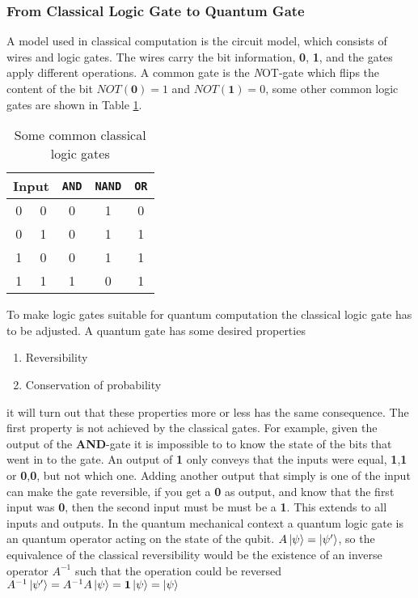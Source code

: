 \subsubsection{From Classical Logic Gate to Quantum Gate}
A model used in classical computation is the circuit model, which consists of wires and logic gates. The wires carry the bit information, \textbf{0}, \textbf{1}, and the gates apply different operations. A common gate is the {\textit NOT}-gate which flips the content of the bit $NOT(\textbf{0}) = 1$ and $NOT(\textbf{1}) = 0$, some other common logic gates are shown in Table \ref{tab:gates}. 

\begin{table}
    \centering
    \begin{tabular}{|c|c|c|c|c|}
    \hline
    \multicolumn{2}{|c|}{Input} & {\tt AND} & {\tt NAND} & {\tt OR}\\
    \hline
    0 & 0 & 0& 1& 0\\
    0 & 1 & 0& 1& 1\\
    1 & 0 & 0& 1& 1\\
    1 & 1 & 1& 0& 1\\
    \hline
    \end{tabular}
    \caption{Some common classical logic gates}
    \label{tab:gates}
\end{table}


To make logic gates suitable for quantum computation the classical logic gate has to be adjusted. A quantum gate has some desired properties
\begin{enumerate}
\item Reversibility 
\item Conservation of probability
\end{enumerate}
it will turn out that these properties more or less has the same consequence. The first property is not achieved by the classical gates. For example, given the output of the \textbf{AND}-gate it is impossible to to know the state of the bits that went in to the gate. An output of \textbf{1} only conveys that the inputs were equal, \textbf{1},\textbf{1} or \textbf{0},\textbf{0}, but not which one. Adding another output that simply is one of the input can make the gate reversible, if you get a \textbf{0} as output, and know that the first input was \textbf{0}, then the second input must be must be a \textbf{1}. This extends to all inputs and outputs. In the quantum mechanical context a quantum logic gate is an quantum operator acting on the state of the qubit. $A\ket{\psi} = \ket{\psi'}$, so the equivalence of the classical reversibility would be the existence of an inverse operator $A^{-1}$ such that the operation could be reversed $A^{-1}\ket{\psi'} = A^{-1}A\ket{\psi} = \mathbf{1}\ket{\psi} = \ket{\psi}$

